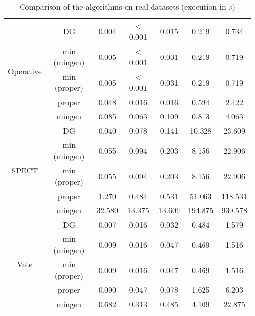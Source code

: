 \begin{table}[ht]
\begin{tabular}{| c | c || c | c | c | c | c |}
	\multirow{5}{*}{Operative} & DG & 0.004 & < 0.001 & 0.015 & 0.219 & 0.734 \\
	& min (mingen) & 0.005 & < 0.001 & 0.031 & 0.219 & 0.719 \\
	& min (proper) & 0.005 & < 0.001 & 0.031 & 0.219 & 0.719 \\
	& proper & 0.048 & 0.016 & 0.016 & 0.594 & 2.422 \\
	& mingen & 0.085 & 0.063 & 0.109 & 0.813 & 4.063 \\ \hline
	
	\multirow{5}{*}{SPECT} & DG & 0.040 & 0.078 & 0.141 & 10.328 & 23.609 \\
	& min (mingen) & 0.055 & 0.094 & 0.203 & 8.156 & 22.906 \\
	& min (proper) & 0.055 & 0.094 & 0.203 & 8.156 & 22.906 \\
	& proper & 1.270 & 0.484 & 0.531 & 51.063 & 118.531 \\
	& mingen & 32.580 & 13.375 & 13.609 & 194.875 & 930.578 \\ \hline
	
	\multirow{5}{*}{Vote} & DG & 0.007 & 0.016 & 0.032 & 0.484 & 1.579 \\ 
	& min (mingen) & 0.009 & 0.016 & 0.047 & 0.469 & 1.516 \\
	& min (proper) & 0.009 & 0.016 & 0.047 & 0.469 & 1.516 \\
	& proper & 0.090 & 0.047 & 0.078 & 1.625 & 6.203 \\
	& mingen & 0.682 & 0.313 & 0.485 & 4.109 & 22.875 \\ \hline
	
	
\end{tabular} 
\caption{Comparison of the algorithms on real datasets (execution in $s$)}
\label{tab:real-exe}
\end{table}

\vspace{1.2em}

